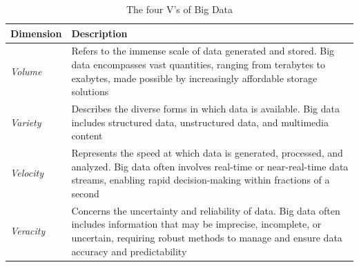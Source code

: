 \begin{table}[h!]
    \centering
    \begin{tabular}{|l|p{10cm}|}
    \hline
    \textbf{Dimension} & \textbf{Description} \\ \hline
    \textit{Volume}    & Refers to the immense scale of data generated and stored. Big data encompasses vast quantities, ranging from terabytes to exabytes, made possible by increasingly affordable storage solutions \\ \hline
    \textit{Variety}   & Describes the diverse forms in which data is available. Big data includes structured data, unstructured data, and multimedia content \\ \hline
    \textit{Velocity}  & Represents the speed at which data is generated, processed, and analyzed. Big data often involves real-time or near-real-time data streams, enabling rapid decision-making within fractions of a second \\ \hline
    \textit{Veracity}  & Concerns the uncertainty and reliability of data. Big data often includes information that may be imprecise, incomplete, or uncertain, requiring robust methods to manage and ensure data accuracy and predictability \\ \hline
    \end{tabular}
    \caption{The four V's of Big Data}
\end{table}
    
